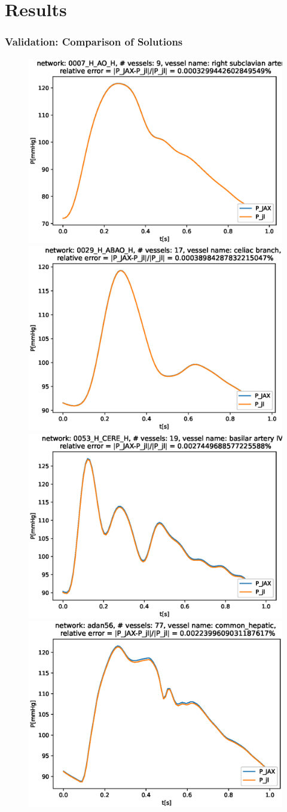 \documentclass{beamer}
\begin{document}
\section{Results}
\begin{frame}
	\frametitle{Validation: Comparison of Solutions}
	\begin{figure} [H]
		\centering
		\includegraphics[width=0.46\columnwidth]{images/0007_H_AO_H_right_subclavian_artery_P.eps}
		\includegraphics[width=0.46\columnwidth]{images/0029_H_ABAO_H_celiac_branch_P.eps
		}
		\includegraphics[width=0.46\columnwidth]{images/0053_H_CERE_H_basilar_artery_IV_P.eps}
		\includegraphics[width=0.46\columnwidth]{images/adan56_common_hepatic_P.eps}
		\label{fig:val}
	\end{figure}
\end{frame}
\end{document}

